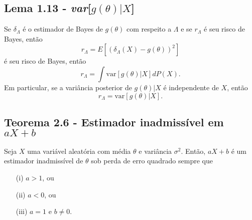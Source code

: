 \subsection{Lema 1.13 - \textit{var}[\texorpdfstring{\(g(\theta)|X\)}{undefined}]} Se $\delta_{\Lambda}$ é o estimador de Bayes de $g(\theta)$ com respeito a $\Lambda$ e se $r_{\Lambda}$ é seu risco de Bayes, então
\[
r_{\Lambda} = E[(\delta_{\Lambda}(X) - g(\theta))^2]
\]
é seu risco de Bayes, então
\[
r_{\Lambda} = \int \text{var}[g(\theta)|X] dP(X).
\]
Em particular, se a variância posterior de $g(\theta)|X$ é independente de $X$, então
\[
r_{\Lambda} = \text{var}[g(\theta)|X].
\]

\subsection{Teorema 2.6 - Estimador inadmissível em \texorpdfstring{\(aX+b\)}{undefined}}
Seja $X$ uma variável aleatória com média $\theta$ e variância $\sigma^2$. Então, $aX + b$ é um estimador inadmissível de $\theta$ sob perda de erro quadrado sempre que
\begin{itemize}
\item[(i)] $a > 1$, ou
\item[(ii)] $a < 0$, ou
\item[(iii)] $a = 1$ e $b \neq 0$.
\end{itemize}
